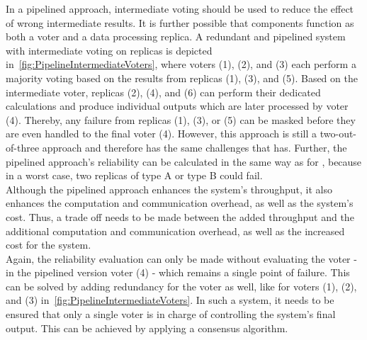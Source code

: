 In a pipelined approach, intermediate voting should be used to reduce the effect of wrong intermediate results.
It is further possible that components function as both a voter and a data processing replica.
A redundant and pipelined system with intermediate voting on replicas is depicted in~\autoref{fig:PipelineIntermediateVoters}, where voters (1), (2), and (3) each perform a majority voting based on the results from replicas (1), (3), and (5).
Based on the intermediate voter, replicas (2), (4), and (6) can perform their dedicated calculations and produce individual outputs which are later processed by voter (4).
Thereby, any failure from replicas (1), (3), or (5) can be masked before they are even handled to the final voter (4).
However, this approach is still a two-out-of-three approach and therefore has the same challenges that  has.
Further, the pipelined approach's reliability can be calculated in the same way as for , because in a worst case, two replicas of type A or type B could fail.
\\

Although the pipelined approach enhances the system's throughput, it also enhances the computation and communication overhead, as well as the system's cost.
Thus, a trade off needs to be made between the added throughput and the additional computation and communication overhead, as well as the increased cost for the system.
\\

Again, the reliability evaluation can only be made without evaluating the voter - in the pipelined version voter (4) - which remains a single point of failure.
This can be solved by adding redundancy for the voter as well, like for voters (1), (2), and (3) in~\autoref{fig:PipelineIntermediateVoters}.
In such a system, it needs to be ensured that only a single voter is in charge of controlling the system's final output.
This can be achieved by applying a consensus algorithm.

